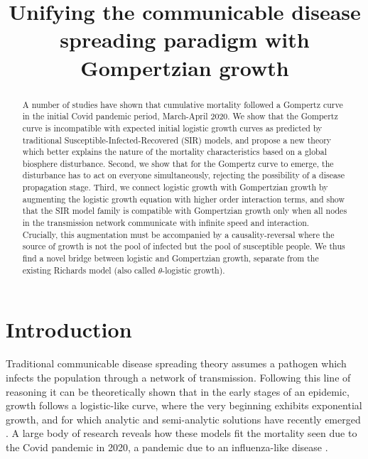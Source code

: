 \documentclass{article}
\title{Unifying the communicable disease spreading paradigm with Gompertzian growth}
\begin{document}
\maketitle

\begin{abstract}
A number of studies have shown that cumulative mortality followed a Gompertz curve in the initial Covid pandemic period, March-April 2020. 
We show that the Gompertz curve is incompatible with expected initial logistic growth curves as predicted by traditional Susceptible-Infected-Recovered (SIR) models, and propose a new theory which better explains the nature of the mortality characteristics based on a global biosphere disturbance. 
Second, we show that for the Gompertz curve to emerge, the disturbance has to act on everyone simultaneously, rejecting the possibility of a disease propagation stage. 
Third, we connect logistic growth with Gompertzian growth by augmenting the logistic growth equation with higher order interaction terms, and show that the SIR model family is compatible with Gompertzian growth only when all nodes in the transmission network communicate with infinite speed and interaction. Crucially, this augmentation must be accompanied by a causality-reversal where the source of growth is not the pool of infected but the pool of susceptible people. We thus find a novel bridge between logistic and Gompertzian growth, separate from the existing Richards model (also called $\theta$-logistic growth).
\end{abstract}


\section*{Introduction}
Traditional communicable disease spreading theory assumes a pathogen which infects the population through a network of transmission. 
Following this line of reasoning it can be theoretically shown that in the early stages of an epidemic, growth follows a logistic-like curve, where the very beginning exhibits exponential growth, and for which analytic and semi-analytic solutions have recently emerged \cite{harko2014exact,kroger2020analytical,schlickeiser2021analytical,heng2020approximately}. 
A large body of research reveals how these models fit the mortality seen due to the Covid pandemic in 2020, a pandemic due to an influenza-like disease \cite{carletti2020covid,cooper2020sir,postnikov2020estimation,munoz2021sir,cooper2022dynamical,saikia2021covid}. 
\end{document}
